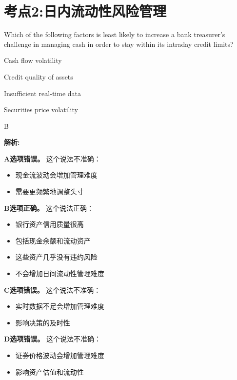 \documentclass{article}
\newcounter{question} %
\newenvironment{explanation}
{\textbf{解析:}\par}
{\par}
\begin{document}
\section{考点2:日内流动性风险管理}
\setcounter{question}{0}


\begin{question}
    Which of the following factors is least likely to increase a bank treasurer's challenge in managing cash in order to stay within its intraday credit limits?
\end{question}

\begin{choices}
    \item Cash flow volatility
    \item Credit quality of assets
    \item Insufficient real-time data
    \item Securities price volatility
\end{choices}

\begin{correctanswer}
    B
\end{correctanswer}

\begin{explanation}
    \textbf{A选项错误。}
    这个说法不准确：
    \begin{itemize}
        \item 现金流波动会增加管理难度
        \item 需要更频繁地调整头寸
    \end{itemize}

    \textbf{B选项正确。}
    这个说法正确：
    \begin{itemize}
        \item 银行资产信用质量很高
        \item 包括现金余额和流动资产
        \item 这些资产几乎没有违约风险
        \item 不会增加日间流动性管理难度
    \end{itemize}

    \textbf{C选项错误。}
    这个说法不准确：
    \begin{itemize}
        \item 实时数据不足会增加管理难度
        \item 影响决策的及时性
    \end{itemize}

    \textbf{D选项错误。}
    这个说法不准确：
    \begin{itemize}
        \item 证券价格波动会增加管理难度
        \item 影响资产估值和流动性
    \end{itemize}
\end{explanation}
\end{document}

